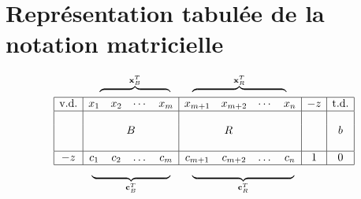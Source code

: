 \documentclass{report}
\begin{document}
\section{Représentation tabulée de la notation matricielle}
\[
\begin{array}{c c}
\begin{array}{c c c c c c c c c c c}
    \multicolumn{4}{c}{\overbrace{\hspace{2.25cm}}^{\mathbf{x}_B^T}} & & \multicolumn{3}{c}{\overbrace{\hspace{3cm}}^{\mathbf{x}_R^T}} & & \\
\end{array} \\
\begin{array}{|c|c c c c|c c c c|c|c|}
\hline
\text{v.d.} & x_1 & x_2 & \cdots & x_m & x_{m+1} & x_{m+2} & \cdots & x_n & -z & \text{t.d.} \\
\hline
& &  & & & &  & & & & \\
& \multicolumn{4}{c|}{B} & \multicolumn{3}{c}{R} & & & b \\
& &  & & & &  & & & & \\
\hline
-z & c_1 &  c_2 &  \dots & c_m & c_{m+1} & c_{m+2} & \dots & c_n & 1 & 0 \\
\hline
\end{array}\\
\begin{array}{c c c c c c c c c c c}
    & & &\underbrace{\hspace{2.5cm}}_{\mathbf{c}_B^T}   & & \underbrace{\hspace{3.25cm}}_{\mathbf{c}_R^T} & & & & & \\
\end{array}
\end{array}
\]
\end{document}
